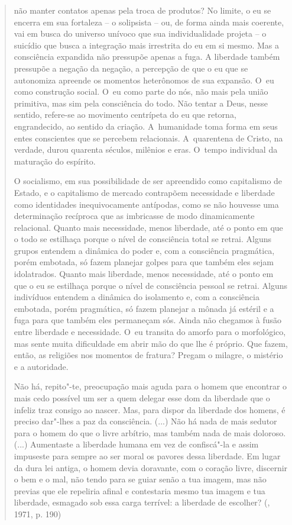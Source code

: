 {\begin{quote}
não manter contatos apenas pela troca de produtos? No limite, o eu se
encerra em sua fortaleza -- o solipsista -- ou, de forma ainda mais
coerente, vai em busca do universo unívoco que sua individualidade
projeta -- o suicídio que busca a integração mais irrestrita do eu em si
mesmo. Mas a consciência expandida não pressupõe apenas a fuga. A
liberdade também pressupõe a negação da negação, a percepção de que o eu
que se autonomiza apreende os momentos heterônomos de sua expansão. O~eu
como construção social. O~eu como parte do nós, não mais pela união
primitiva, mas sim pela consciência do todo. Não tentar a Deus, nesse
sentido, refere-se ao movimento centrípeta do eu que retorna,
engrandecido, ao sentido da criação. A~humanidade toma forma em seus
entes conscientes que se percebem relacionais. A~quarentena de Cristo,
na verdade, durou quarenta séculos, milênios e eras. O~tempo individual
da maturação do espírito.

O socialismo, em sua possibilidade de ser apreendido como capitalismo de
Estado, e o capitalismo de mercado contrapõem necessidade e liberdade
como identidades inequivocamente antípodas, como se não houvesse uma
determinação recíproca que as imbricasse de modo dinamicamente
relacional. Quanto mais necessidade, menos liberdade, até o ponto em que
o todo se estilhaça porque o nível de consciência total se retrai.
Alguns grupos entendem a dinâmica do poder e, com a consciência
pragmática, porém embotada, só fazem planejar golpes para que também
eles sejam idolatrados. Quanto mais liberdade, menos necessidade, até o
ponto em que o eu se estilhaça porque o nível de consciência pessoal se
retrai. Alguns indivíduos entendem a dinâmica do isolamento e, com a
consciência embotada, porém pragmática, só fazem planejar a mônada já
estéril e a fuga para que também eles permaneçam sós. Ainda não chegamos
à fusão entre liberdade e necessidade. O~eu transita do amorfo para o
morfológico, mas sente muita dificuldade em abrir mão do que lhe é
próprio. Que fazem, então, as religiões nos momentos de fratura? Pregam
o milagre, o mistério e a autoridade.

Não há, repito"-te, preocupação mais aguda para o homem que encontrar o
mais cedo possível um ser a quem delegar esse dom da liberdade que o
infeliz traz consigo ao nascer. Mas, para dispor da liberdade dos
homens, é preciso dar"-lhes a paz da consciência. (...) Não há nada de
mais sedutor para o homem do que o livre arbítrio, mas também nada de
mais doloroso. (...) Aumentaste a liberdade humana em vez de confiscá"-la
e assim impuseste para sempre ao ser moral os pavores dessa liberdade.
Em lugar da dura lei antiga, o homem devia doravante, com o coração
livre, discernir o bem e o mal, não tendo para se guiar senão a tua
imagem, mas não previas que ele repeliria afinal e contestaria mesmo tua
imagem e tua liberdade, esmagado sob essa carga terrível: a liberdade de
escolher? (, 1971, p. 190)


\end{quote}}
